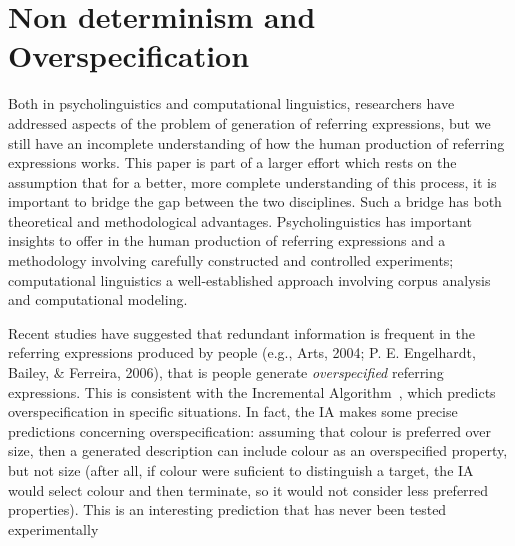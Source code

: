 \section{Non determinism and Overspecification}\label{sec:overspecification}


Both in psycholinguistics and computational linguistics, researchers have addressed aspects of the problem of generation of referring expressions, but we still have an incomplete understanding of how the human production of referring expressions works. This paper is part of a larger effort which rests on the assumption that for a better, more complete understanding of this process, it is important to bridge the gap between the two disciplines. Such a bridge has both theoretical and methodological advantages. Psycholinguistics has important insights to offer in the human production of referring expressions and a methodology involving carefully constructed and controlled experiments; computational linguistics a well-established approach involving corpus analysis and computational modeling.

Recent studies have suggested that redundant information is frequent in the referring expressions produced by people (e.g., Arts, 2004; P. E. Engelhardt, Bailey, & Ferreira, 2006), that is people generate \emph{overspecified} referring expressions. This is consistent with the Incremental Algorithm~\cite{dale95}, which predicts overspecification in specific situations. In fact, the IA makes some precise predictions concerning overspecification: assuming that colour is preferred over size, then a generated description can include colour as an overspecified property, but not size (after all, if colour were suficient to distinguish a target, the IA would select colour and then terminate, so it would not consider less preferred properties). This is an interesting prediction that has never been
tested experimentally

